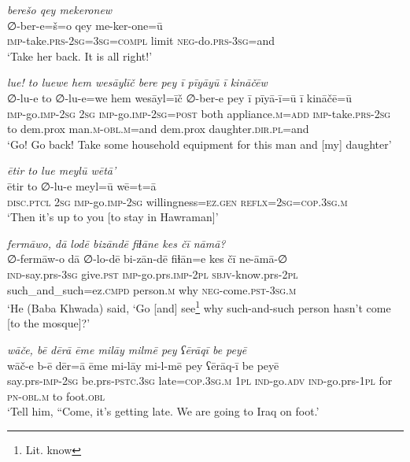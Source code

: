 \ea \label{ŽP.212}
\textit{berešo qey mekeronew} \\ 
\gll ∅-ber-e=š=o qey me-ker-one=ū \\ 
 \textsc{imp-}take\textsc{.prs}-\textsc{2sg}\textsc{=3sg}\textsc{=compl} limit \textsc{neg-}do\textsc{.prs}\textsc{-3sg}=and \\ 
\glt `Take her back. It is all right!'
\z 
 
\ea \label{ŽP.262}
\textit{lue! to luewe hem wesāylīč bere pey ī pīyāyū ī kināčēw} \\ 
\gll ∅-lu-e to ∅-lu-e=we hem wesāyl=īč ∅-ber-e pey ī pīyā-ī=ū ī kināčē=ū \\ 
 \textsc{imp-}go.\textsc{imp-}\textsc{2sg} \textsc{2sg} \textsc{imp-}go.\textsc{imp-}\textsc{2sg}\textsc{=\textsc{post}} both appliance\textsc{.m}\textsc{=add} \textsc{imp-}take\textsc{.prs}-\textsc{2sg} to dem.prox man\textsc{.m}\textsc{-obl}\textsc{.m}=and dem.prox daughter\textsc{.dir}\textsc{.pl}=and \\ 
\glt `Go! Go back! Take some household equipment for this man and [my] daughter'
\z 
 
\ea \label{ŽP.263}
\textit{ētir to lue meylū wētā’} \\ 
\gll ētir to ∅-lu-e meyl=ū wē=t=ā \\ 
 \textsc{disc.ptcl} \textsc{2sg} \textsc{imp-}go.\textsc{imp-}\textsc{2sg} willingness\textsc{\textsc{=ez.gen}} \textsc{reflx}\textsc{=\textsc{2sg}}\textsc{=cop}\textsc{.3sg}\textsc{.m} \\ 
\glt `Then it’s up to you [to stay in Hawraman]'
\z 
 
\ea \label{BP.77}
\textit{fermāwo, dā lodē bizāndē fiɫāne kes čī nāmā?} \\ 
\gll ∅-fermāw-o dā ∅-lo-dē bi-zān-dē fiɫān=e kes čī ne-āmā-∅ \\ 
 \textsc{ind-}say.prs\textsc{-3sg} give\textsc{.pst} \textsc{imp-}go.prs.\textsc{imp-}\textsc{2pl} \textsc{sbjv-}know.prs-\textsc{2pl} such\_and\_such=ez\textsc{.cmpd} person\textsc{.m} why \textsc{neg-}come\textsc{.pst}\textsc{-3sg}\textsc{.m} \\ 
\glt `He (Baba Khwada) said, ‘Go [and] see\footnote{Lit. know} why such-and-such person hasn’t come [to the mosque]?'
\z 
 
\ea \label{BP.78}
\textit{wāče, bē dērā ēme milāy milmē pey ʕērāqī be peyē} \\ 
\gll wāč-e b-ē dēr=ā ēme mi-lāy mi-l-mē pey ʕērāq-ī be peyē \\ 
 say.prs-\textsc{imp-}\textsc{2sg} be.prs\textsc{-pstc}\textsc{.3sg} late\textsc{=cop}\textsc{.3sg}\textsc{.m} \textsc{1pl} \textsc{ind-}go\textsc{.adv} \textsc{ind-}go.prs\textsc{-\textsc{1pl}} for \textsc{pn}\textsc{-obl}\textsc{.m} to foot\textsc{.obl} \\ 
\glt `Tell him, “Come, it’s getting late. We are going to Iraq on foot.'
\z 
 
